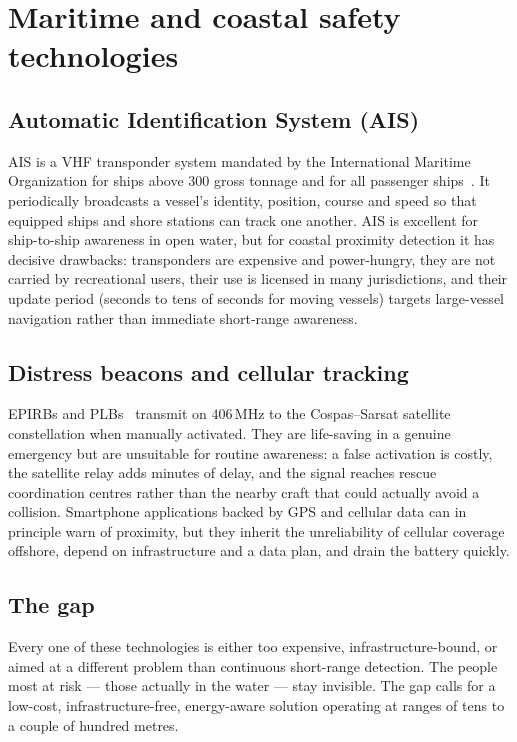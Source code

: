 \documentclass[12pt,a4paper,oneside]{report}
\begin{document}
\section{Maritime and coastal safety technologies}
\subsection{Automatic Identification System (AIS)}
AIS is a VHF transponder system mandated by the International Maritime
Organization for ships above $300$ gross tonnage and for all passenger
ships~\cite{imo-ais}. It periodically broadcasts a vessel's identity, position,
course and speed so that equipped ships and shore stations can track one
another. AIS is excellent for ship-to-ship awareness in open water, but for
coastal proximity detection it has decisive drawbacks: transponders are
expensive and power-hungry, they are not carried by recreational users, their
use is licensed in many jurisdictions, and their update period (seconds to tens
of seconds for moving vessels) targets large-vessel navigation rather than
immediate short-range awareness.

\subsection{Distress beacons and cellular tracking}
EPIRBs and PLBs~\cite{noaa-beacons} transmit on $406$\,MHz to the
Cospas--Sarsat satellite constellation when manually activated. They are
life-saving in a genuine emergency but are unsuitable for routine awareness: a
false activation is costly, the satellite relay adds minutes of delay, and the
signal reaches rescue coordination centres rather than the nearby craft that
could actually avoid a collision. Smartphone applications backed by GPS and
cellular data can in principle warn of proximity, but they inherit the
unreliability of cellular coverage offshore, depend on infrastructure and a
data plan, and drain the battery quickly.

\subsection{The gap}
Every one of these technologies is either too expensive, infrastructure-bound,
or aimed at a different problem than continuous short-range detection. The
people most at risk --- those actually in the water --- stay invisible. The gap
calls for a low-cost, infrastructure-free, energy-aware solution operating at
ranges of tens to a couple of hundred metres.
\end{document}
